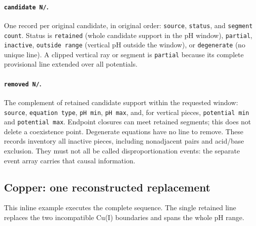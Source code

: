 \documentclass[a4paper,11pt]{ltxdoc}
\begin{document}
\paragraph{\texttt{candidate N/}.}
One record per original candidate, in original order: \texttt{source},
\texttt{status}, and \texttt{segment count}. Status is \texttt{retained}
(whole candidate support in the pH window), \texttt{partial}, \texttt{inactive},
\texttt{outside range} (vertical pH outside the window), or \texttt{degenerate}
(no unique line). A clipped vertical ray or segment is \texttt{partial} because
its complete provisional line extended over all potentials.

\paragraph{\texttt{removed N/}.}
The complement of retained candidate support within the requested window:
\texttt{source}, \texttt{equation type}, \texttt{pH min}, \texttt{pH max},
and, for vertical pieces, \texttt{potential min} and \texttt{potential max}.
Endpoint closures can meet retained segments; this does not delete a coexistence
point. Degenerate equations have no line to remove. These records inventory all
inactive pieces, including nonadjacent pairs and acid/base exclusion. They must
not all be called disproportionation events: the separate event array carries
that causal information.

\subsection{Copper: one reconstructed replacement}
This inline example executes the complete sequence. The single retained line
replaces the two incompatible Cu(I) boundaries and spans the whole pH range.
\begin{codeexample}[width=7cm]
\cu
{}
\end{codeexample}
\end{document}
